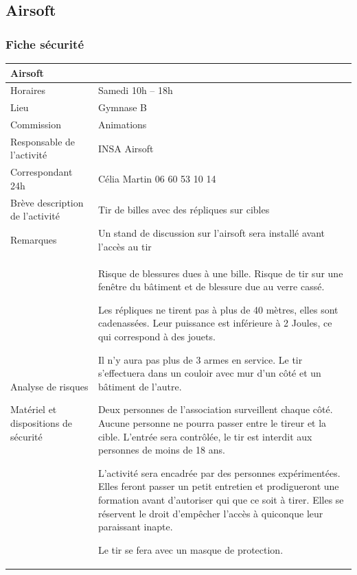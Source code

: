 \documentclass[hidelinks, paper=a4, fontsize=13pt]{report}
\begin{document}
\subsection{Airsoft}


\subsubsection{Fiche sécurité}
\begin{center}
\begin{tabular}{ | p{6cm} | p{10cm} | }
\hline
	\multicolumn{2}{|l|}{Airsoft}  \\ \hline
	Horaires & Samedi 10h – 18h \\ \hline
	Lieu & Gymnase B \\ \hline
	Commission & Animations \\ \hline
	Responsable de l'activité & INSA Airsoft \\ \hline
	Correspondant 24h & Célia Martin 06 60 53 10 14 \\ \hline
	Brève description de l'activité & Tir de billes avec des répliques sur cibles \\ \hline
	Remarques & Un stand de discussion sur l'airsoft sera installé avant l'accès au tir \\ \hline
	Analyse de risques
	
Matériel et dispositions de sécurité & Risque de blessures dues à une bille. Risque de tir sur une fenêtre du bâtiment et de blessure due au verre cassé.

Les répliques ne tirent pas à plus de 40 mètres, elles sont cadenassées. Leur puissance est inférieure à 2 Joules, ce qui correspond à des jouets.

Il n’y aura pas plus de 3 armes en service. Le tir s’effectuera dans un couloir avec mur d'un côté et un bâtiment de l'autre.

Deux personnes de l'association surveillent chaque côté. Aucune personne ne pourra passer entre le tireur et la cible. L’entrée sera contrôlée, le tir est interdit aux personnes de moins de 18 ans.

L’activité sera encadrée par des personnes expérimentées. Elles feront passer un petit entretien et prodigueront une formation avant d’autoriser qui que ce soit à tirer. Elles se réservent le droit d’empêcher l’accès à quiconque leur paraissant inapte.

Le tir se fera avec un masque de protection. \\ \hline
\end{tabular}

\end{center}
\end{document}

